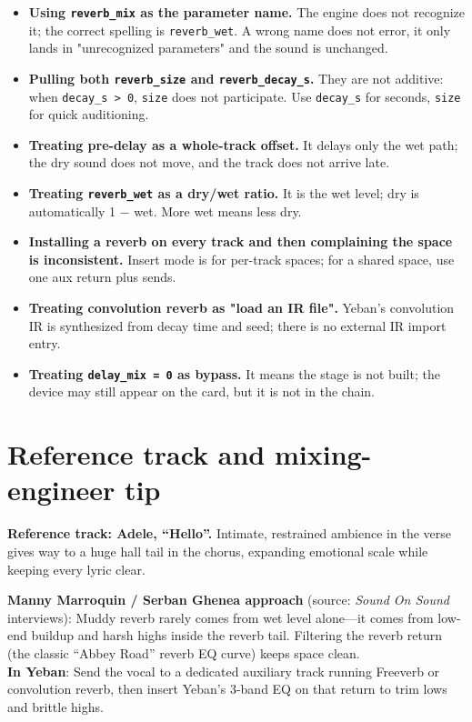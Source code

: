 \begin{itemize}
  \item \textbf{Using \texttt{reverb\_mix} as the parameter name.} The engine does not recognize it; the correct spelling is \texttt{reverb\_wet}. A wrong name does not error, it only lands in "unrecognized parameters" and the sound is unchanged.
  \item \textbf{Pulling both \texttt{reverb\_size} and \texttt{reverb\_decay\_s}.} They are not additive: when \texttt{decay\_s > 0}, \texttt{size} does not participate. Use \texttt{decay\_s} for seconds, \texttt{size} for quick auditioning.
  \item \textbf{Treating pre-delay as a whole-track offset.} It delays only the wet path; the dry sound does not move, and the track does not arrive late.
  \item \textbf{Treating \texttt{reverb\_wet} as a dry/wet ratio.} It is the wet level; dry is automatically 1 − wet. More wet means less dry.
  \item \textbf{Installing a reverb on every track and then complaining the space is inconsistent.} Insert mode is for per-track spaces; for a shared space, use one aux return plus sends.
  \item \textbf{Treating convolution reverb as "load an IR file".} Yeban's convolution IR is synthesized from decay time and seed; there is no external IR import entry.
  \item \textbf{Treating \texttt{delay\_mix = 0} as bypass.} It means the stage is not built; the device may still appear on the card, but it is not in the chain.
\end{itemize}

\section{Reference track and mixing-engineer tip}

\textbf{Reference track: Adele, ``Hello''.} Intimate, restrained ambience in the verse gives way to a huge hall tail in the chorus, expanding emotional scale while keeping every lyric clear.

\begin{tipbox}
\textbf{Manny Marroquin / Serban Ghenea approach} (source: \emph{Sound On Sound} interviews): Muddy reverb rarely comes from wet level alone—it comes from low-end buildup and harsh highs inside the reverb tail. Filtering the reverb return (the classic ``Abbey Road'' reverb EQ curve) keeps space clean.\\
\textbf{In Yeban}: Send the vocal to a dedicated auxiliary track running Freeverb or convolution reverb, then insert Yeban's 3-band EQ on that return to trim lows and brittle highs.
\end{tipbox}

